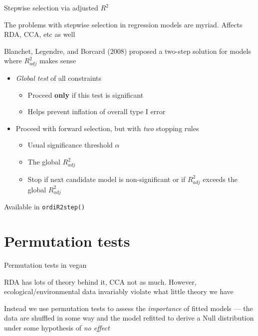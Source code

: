 \documentclass[10pt,ignorenonframetext,compress, aspectratio=169]{beamer}
\begin{document}
\begin{frame}{Stepwise selection via adjusted $R^2$}

The problems with stepwise selection in regression models are myriad.
Affects RDA, CCA, etc as well

Blanchet, Legendre, and Borcard (2008) proposed a two-step solution for
models where $R^2_{adj}$ makes sense

\begin{itemize}
\itemsep1pt\parskip0pt
\item
  \emph{Global test} of all constraints

  \begin{itemize}
  \itemsep1pt\parskip0pt
  \item
    Proceed \textbf{only} if this test is significant
  \item
    Helps prevent inflation of overall type I error
  \end{itemize}
\item
  Proceed with forward selection, but with \emph{two} stopping rules

  \begin{itemize}
  \itemsep1pt\parskip0pt
  \item
    Usual significance threshold $\alpha$
  \item
    The global $R^2_{adj}$
  \item
    Stop if next candidate model is non-significant or if $R^2_{adj}$
    exceeds the global $R^2_{adj}$
  \end{itemize}
\end{itemize}

Available in \texttt{ordiR2step()}

\end{frame}

\section{Permutation tests}\label{permutation-tests}

\begin{frame}{Permutation tests in vegan}

RDA has lots of theory behind it, CCA not as much. However,
ecological/environmental data invariably violate what little theory we
have

Instead we use permutation tests to assess the \emph{importance} of
fitted models --- the data are shuffled in some way and the model
refitted to derive a Null distribution under some hypothesis of \emph{no
effect}

\end{frame}
\end{document}
